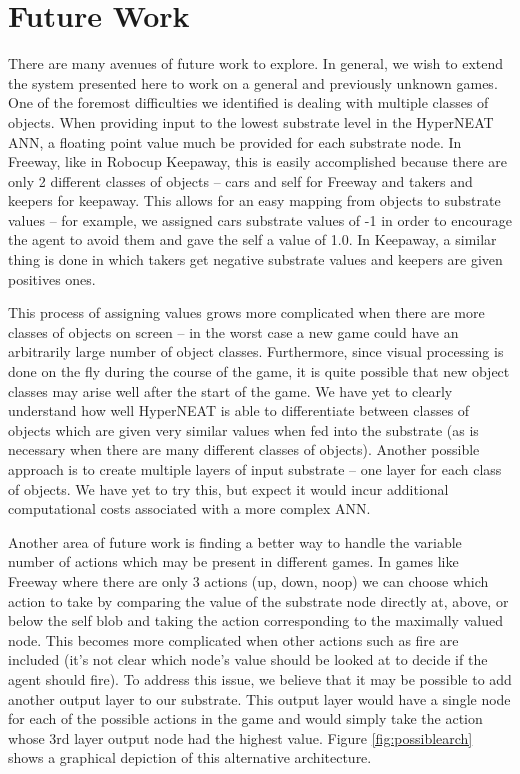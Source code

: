 \documentclass{article}
\begin{document}
\section{Future Work}
There are many avenues of future work to explore. In general, we wish to extend the system presented here to work on a general and previously unknown games. One of the foremost difficulties we identified is dealing with multiple classes of objects. When providing input to the lowest substrate level in the HyperNEAT ANN, a floating point value much be provided for each substrate node. In Freeway, like in Robocup Keepaway, this is easily accomplished because there are only 2 different classes of objects -- cars and self for Freeway and takers and keepers for keepaway. This allows for an easy mapping from objects to substrate values -- for example, we assigned cars substrate values of -1 in order to encourage the agent to avoid them and gave the self a value of 1.0. In Keepaway, a similar thing is done in which takers get negative substrate values and keepers are given positives ones. 

This process of assigning values grows more complicated when there are more classes of objects on screen -- in the worst case a new game could have an arbitrarily large number of object classes. Furthermore, since visual processing is done on the fly during the course of the game, it is quite possible that new object classes may arise well after the start of the game. We have yet to clearly understand how well HyperNEAT is able to differentiate between classes of objects which are given very similar values when fed into the substrate (as is necessary when there are many different classes of objects). Another possible approach is to create multiple layers of input substrate -- one layer for each class of objects. We have yet to try this, but expect it would incur additional computational costs associated with a more complex ANN.

Another area of future work is finding a better way to handle the variable number of actions which may be present in different games. In games like Freeway where there are only 3 actions (up, down, noop) we can choose which action to take by comparing the value of the substrate node directly at, above, or below the self blob and taking the action corresponding to the maximally valued node. This becomes more complicated when other actions such as fire are included (it's not clear which node's value should be looked at to decide if the agent should fire). To address this issue, we believe that it may be possible to add another output layer to our substrate. This output layer would have a single node for each of the possible actions in the game and would simply take the action whose 3rd layer output node had the highest value. Figure \ref{fig:possiblearch} shows a graphical depiction of this alternative architecture.
\end{document}
